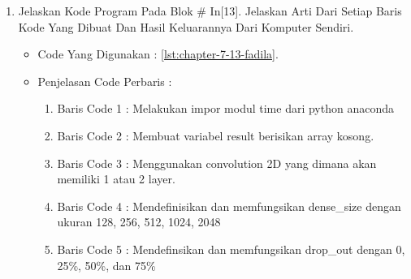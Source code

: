 \begin{enumerate}
\begin{itemize}
\begin{enumerate}
\item Baris Code 7	: Mendefinisikan variabel score dengan fungsi evaluate dari model yang ada dengan parameter test\_input, tst\_output dan verbose=2 dimana memprediksi output untuk input yang diberikan dan kemudian menghitung fungsi metrik yang ditentukan dalam modelnya
\item Baris Code 8	: Mencetak score optimasi dari test dengan ketentuan nilai parameter 0
\item Baris Code 9	: Mencetak score akurasi dari test dengan ketentuan nilai parameter 1
\end{enumerate}
\par
\item Hasil : \ref{chapter-7-in-12-fadila}
\par
\par
\begin{figure}[!hbtp]
\centering
\texttt{[image: figures/chapter-7-in-12-fadila.jpg]}
\caption{Code Program Pada In [12] - fadila}
\label{chapter-7-in-12-fadila}
\end{figure}
\par
\par
\end{itemize}
\par
\par
\par
\item Jelaskan Kode Program Pada Blok \# In[13]. Jelaskan Arti Dari Setiap Baris Kode Yang Dibuat Dan Hasil Keluarannya Dari Komputer Sendiri.
\begin{itemize}
\item Code Yang Digunakan : \ref{lst:chapter-7-13-fadila}.

\par
\par
\item Penjelasan Code Perbaris	: 
\begin{enumerate}
\item Baris Code 1	: Melakukan impor modul time dari python anaconda
\item Baris Code 2	: Membuat variabel result berisikan array kosong.
\item Baris Code 3	: Menggunakan convolution 2D yang dimana akan memiliki 1 atau 2 layer.
\item Baris Code 4	: Mendefinisikan dan memfungsikan dense\_size dengan ukuran 128, 256, 512, 1024, 2048
\item Baris Code 5	: Mendefinsikan dan memfungsikan drop\_out dengan 0, 25\%, 50\%, dan 75\%

\end{enumerate}
\end{itemize}
\end{enumerate}
